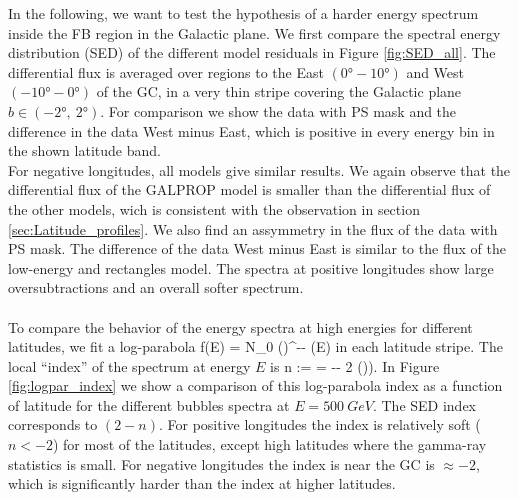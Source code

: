 In the following, we want to test the hypothesis of a harder energy spectrum inside the FB region in the Galactic plane. We first compare the spectral energy distribution (SED) of the different model residuals in Figure \ref{fig:SED_all}. The differential flux is averaged over regions to the East $(\ang{0} - \ang{10})$ and West $(\ang{-10} - \ang{0})$ of the GC, in a very thin stripe covering the Galactic plane $b \in (\ang{-2},\ \ang{2})$. For comparison we show the data with PS mask and the difference in the data West minus East, which is positive in every energy bin in the shown latitude band.\\
For negative longitudes, all models give similar results. We again observe that the differential flux of the GALPROP model is smaller than the differential flux of the other models, wich is consistent with the observation in section \ref{sec:Latitude_profiles}. We also find an assymmetry in the flux of the data with PS mask. The difference of the data West minus East is similar to the flux of the low-energy and rectangles model. The spectra at positive longitudes show large oversubtractions and an overall softer spectrum. \\
\\
To compare the behavior of the energy spectra at high energies for different latitudes, 
we fit a log-parabola
 \be
 f(E) = N_0 \left(\right)^{-\alpha - \beta \ln(E)}
 \ee
in each latitude stripe. The local ``index'' of the spectrum at energy $E$ is
 \be 
n :=  = -\alpha - 2 \beta \ln()).
 \ee
In Figure \ref{fig:logpar_index} we show a comparison of this log-parabola index as a function of latitude for the different bubbles spectra at $E = \SI{500}{GeV}$.  The SED index corresponds to $(2 - n)$.
For positive longitudes the index is relatively soft ($n < -2$) for most of the latitudes, 
except high latitudes where the gamma-ray statistics is small.
For negative longitudes the index is near the GC is $\approx -2$, 
which is significantly harder than the index at higher latitudes.
